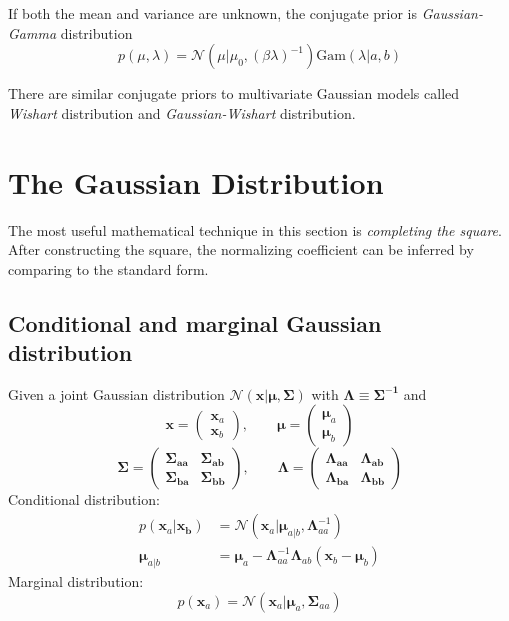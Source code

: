 \documentclass[a4paper]{book}
\newcommand{\up}{\mathrm}
\renewcommand{\bf}{\mathbf}
\renewcommand{\cal}{\mathcal}
\begin{document}
If both the mean and variance are unknown, the conjugate prior is \emph{Gaussian-Gamma} distribution
\begin{equation}
	p(\mu,\lambda)=\cal{N}(\mu|\mu_0,(\beta\lambda)^{-1})\up{Gam}(\lambda|a,b)
\end{equation}

There are similar conjugate priors to multivariate Gaussian models called \emph{Wishart} distribution and \emph{Gaussian-Wishart} distribution.
\section{The Gaussian Distribution}
The most useful mathematical technique in this section is \emph{completing the square}. After constructing the square, the normalizing coefficient can be inferred by comparing to the standard form.
\subsection{Conditional and marginal Gaussian distribution}
Given a joint Gaussian distribution $\cal{N}(\bf{x}|\boldsymbol{\mu},\boldsymbol\Sigma)$ with $\boldsymbol{\Lambda\equiv \Sigma^{-1}}$ and
\begin{equation}
\bf{x}=\left( \begin{array}{c}
\bf{x}_a \\ \bf{x}_b
\end{array} \right) ,\qquad \boldsymbol{\mu}=\left(\begin{array}{c}
\boldsymbol{\mu}_a\\
\boldsymbol{\mu}_b
\end{array}\right)
\end{equation} 
\begin{equation}
\boldsymbol{\Sigma}=\boldsymbol{\begin{pmatrix}
\Sigma_{aa} & \Sigma_{ab} \\
\Sigma_{ba} & \Sigma_{bb}
\end{pmatrix}},\qquad 
\boldsymbol{\Lambda=\begin{pmatrix}
\Lambda_{aa} & \Lambda_{ab}\\
\Lambda_{ba} & \Lambda_{bb}
\end{pmatrix}}
\end{equation}
Conditional distribution:
\begin{align}
p(\bf{x}_a|\bf{x_b})&=\cal{N}(\bf{x}_a|\boldsymbol{\mu}_{a|b},\boldsymbol\Lambda_{aa}^{-1})\\
\boldsymbol{\mu}_{a|b}&=\boldsymbol \mu_a - \boldsymbol{\Lambda}_{aa}^{-1}\boldsymbol{\Lambda}_{ab}(\bf{x}_b-\boldsymbol{\mu}_b)
\end{align}
Marginal distribution:
\begin{equation}
	p(\bf{x}_a)=\cal{N}(\bf{x}_a|\boldsymbol{\mu}_a,\boldsymbol{\Sigma}_{aa})
\end{equation}
\end{document}
